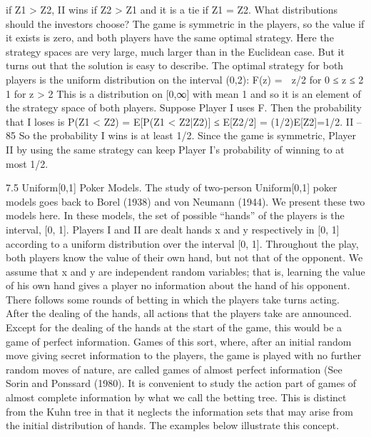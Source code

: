 if Z1 > Z2, II wins if Z2 > Z1 and it is a tie if Z1 = Z2. What distributions should the
investors choose?
The game is symmetric in the players, so the value if it exists is zero, and both players
have the same optimal strategy. Here the strategy spaces are very large, much larger than
in the Euclidean case. But it turns out that the solution is easy to describe. The optimal
strategy for both players is the uniform distribution on the interval (0,2):
F(z) =  z/2 for 0 ≤ z ≤ 2
1 for z > 2
This is a distribution on [0,∞] with mean 1 and so it is an element of the strategy space
of both players. Suppose Player I uses F. Then the probability that I loses is
P(Z1 < Z2) = E[P(Z1 < Z2|Z2)] ≤ E[Z2/2] = (1/2)E[Z2]=1/2.
II – 85
So the probability I wins is at least 1/2. Since the game is symmetric, Player II by using
the same strategy can keep Player I’s probability of winning to at most 1/2.

7.5 Uniform[0,1] Poker Models. The study of two-person Uniform[0,1] poker
models goes back to Borel (1938) and von Neumann (1944). We present these two models
here. In these models, the set of possible “hands” of the players is the interval, [0, 1].
Players I and II are dealt hands x and y respectively in [0, 1] according to a uniform
distribution over the interval [0, 1]. Throughout the play, both players know the value of
their own hand, but not that of the opponent. We assume that x and y are independent
random variables; that is, learning the value of his own hand gives a player no information
about the hand of his opponent.
There follows some rounds of betting in which the players take turns acting. After
the dealing of the hands, all actions that the players take are announced. Except for the
dealing of the hands at the start of the game, this would be a game of perfect information.
Games of this sort, where, after an initial random move giving secret information to the
players, the game is played with no further random moves of nature, are called games of
almost perfect information (See Sorin and Ponssard (1980).
It is convenient to study the action part of games of almost complete information by
what we call the betting tree. This is distinct from the Kuhn tree in that it neglects the
information sets that may arise from the initial distribution of hands. The examples below
illustrate this concept.

